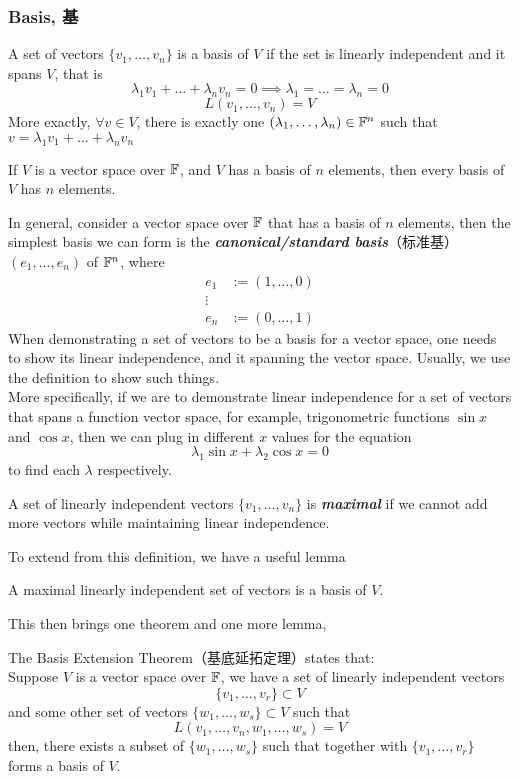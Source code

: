 \subsubsection{Basis, 基}
\begin{definition}
    A set of vectors $\{v_1, \dots, v_n\}$ is a basis of $V$ if the set is linearly independent and it spans $V$, that is
    $$\lambda_1 v_1 + \dots + \lambda_n v_n = 0 \implies \lambda_1 = \dots = \lambda_n = 0$$
    $$L(v_1, \dots, v_n) = V$$
    More exactly, $\forall v \in V$, there is exactly one $(\lambda_1, \dots, \lambda_n) \in \mathbb{F}^n$ such that $v = \lambda_1 v_1 + \dots + \lambda_n v_n$
\end{definition}
\begin{theorem}
    If $V$ is a vector space over $\mathbb{F}$, and $V$ has a basis of $n$ elements, then every basis of $V$ has $n$ elements.
\end{theorem}
In general, consider a vector space over $\mathbb{F}$ that has a basis of $n$ elements, then the simplest basis we can form is the \textbf{\textit{canonical/standard basis}}（标准基） $(e_1, \dots, e_n)$ of $\mathbb{F}^n$, where
\begin{align*}
    e_1 & := (1, \dots, 0) \\
    \vdots \\
    e_n & := (0, \dots, 1)
\end{align*}
When demonstrating a set of vectors to be a basis for a vector space, one needs to show its linear independence, and it spanning the vector space. Usually, we use the definition to show such things. \\
More specifically, if we are to demonstrate linear independence for a set of vectors that spans a function vector space, for example, trigonometric functions $\sin{x}$ and $\cos{x}$, then we can plug in different $x$ values for the equation
$$\lambda_1 \sin{x} + \lambda_2 \cos{x} = 0$$
to find each $\lambda$ respectively.
\begin{definition}
    A set of linearly independent vectors $\{v_1, \dots, v_n\}$ is \textbf{\textit{maximal}} if we cannot add more vectors while maintaining linear independence.
\end{definition}
To extend from this definition, we have a useful lemma
\begin{lemma}
    A maximal linearly independent set of vectors is a basis of $V$.
\end{lemma}
This then brings one theorem and one more lemma,
\begin{theorem}
    The Basis Extension Theorem（基底延拓定理）states that: \\
    Suppose $V$ is a vector space over $\mathbb{F}$, we have a set of linearly independent vectors $$\{v_1, \dots, v_r\} \subset V$$ and some other set of vectors $\{w_1, \dots, w_s\} \subset V$ such that
    $$L(v_1, \dots, v_n, w_1, \dots, w_s) = V$$
    then, there exists a subset of $\{w_1, \dots, w_s\}$ such that together with $\{v_1, \dots, v_r\}$ forms a basis of $V$.
\end{theorem}
